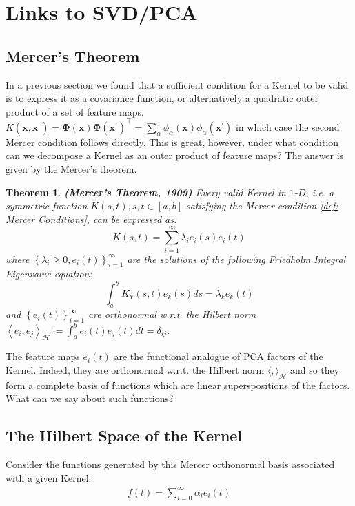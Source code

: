 \documentclass[11pt]{article}
\theoremstyle{plain} %
\newtheorem{theorem}{Theorem}[section]
\theoremstyle{remark}
\begin{document}
\section{Links to SVD/PCA}
\subsection{Mercer's Theorem}
In a previous section we found that a sufficient condition for a Kernel to be
valid is to express it as a covariance function, or alternatively a quadratic
outer product of a set of feature maps, $K\left(\mathbf{x},
  \mathbf{x}^{\prime}\right)=\boldsymbol{\Phi}(\mathbf{x})
  \boldsymbol{\Phi}\left(\mathbf{x}^{\prime}\right)^\top=\sum_{\alpha}
  \phi_{\alpha}(\mathbf{x}) \phi_{\alpha}\left(\mathbf{x}^{\prime}\right)$ in
which case the second Mercer condition follows directly. This is great, however, under what condition
can we decompose a Kernel as an outer product of feature maps? The answer is given by the Mercer's theorem.

\begin{theorem}\textbf{(Mercer's Theorem, 1909)}
  Every valid Kernel in $1$-$D$, i.e. a symmetric function $K(s, t), s, t \in[a, b]$ satisfying the Mercer condition \cref{def: Mercer Conditions}, can be expressed
  as:
  $$
    K(s, t)=\sum_{i=1}^{\infty} \lambda_{i} e_{i}(s) e_{i}(t)
  $$
  where $\left\{\lambda_{i} \geq 0, e_{i}(t)\right\}_{i=1}^{\infty}$ are the
  solutions of the following Friedholm Integral Eigenvalue equation:
  $$
    \int_{a}^{b} K_{Y}(s, t) e_{k}(s) d s=\lambda_{k} e_{k}(t)
  $$
  and $\left\{e_{i}(t)\right\}_{i=1}^{\infty}$ are orthonormal w.r.t. the Hilbert
  norm $\left\langle e_{i}, e_{j}\right\rangle_{\mathcal{H}}:=\int_{a}^{b} e_{i}(t)
    e_{j}(t) d t=\delta_{i j}$.
\end{theorem}

The feature maps $e_{i}(t)$ are the functional analogue of PCA factors of the
Kernel. Indeed, they are orthonormal w.r.t. the Hilbert norm
$\langle,\rangle_{\mathcal{H}}$ and so they form a complete basis of functions
which are linear superspositions of the factors. What can we say about such
functions?
\subsection{The Hilbert Space of the Kernel}
Consider the functions generated by this Mercer orthonormal basis associated
with a given Kernel:
\begin{align}
  f(t)=\sum_{i=0}^{\infty} \alpha_{i} e_{i}(t)
  \label{eq: functions generated by this Mercer orthonormal basis}
\end{align}
  
\end{document}
